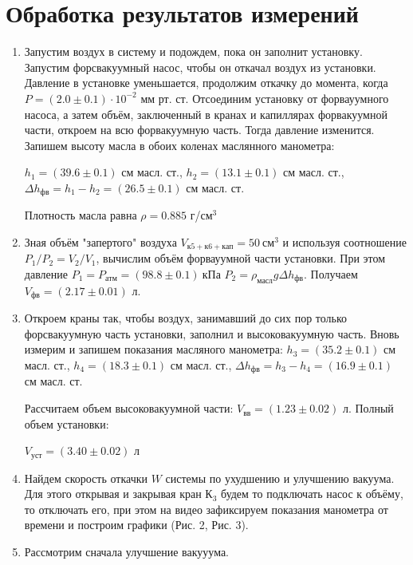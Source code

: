 \documentclass[12pt,a4paper]{article}
\begin{document}
\section{Обработка результатов измерений}
\begin{enumerate}
\item Запустим воздух в систему и подождем, пока он заполнит установку. Запустим форсвакуумный насос, чтобы он откачал воздух из установки. Давление в установке уменьшается, продолжим откачку до момента, когда $P = (2.0 \pm 0.1) \cdot 10^{-2}$ мм рт. ст. Отсоединим установку от форвауумного насоса, а затем объём, заключенный в кранах и капиллярах форвакуумной части, откроем на всю форвакуумную часть. Тогда давление изменится. Запишем высоту масла в обоих коленах маслянного манометра: 

$h_1 = (39.6 \pm 0.1)$ см масл. ст., $h_2 = (13.1 \pm 0.1)$ см масл. ст., $\Delta h_{фв} = h_1 - h_2 = (26.5 \pm 0.1)$ см масл. ст.

Плотность масла равна $\rho = 0.885$ г/см$^3$


\item Зная объём "запертого" воздуха $V_{к5+к6+кап} = 50 ~ см^3$ и используя соотношение $P_1/P_2=V_2/V_1$, вычислим объём форвауумной части установки. При этом давление $P_1 = P_{атм} = (98.8 \pm 0.1) ~ кПа$ $P_2 = \rho_{масл} g \Delta h_{фв}$. Получаем $V_{фв} = (2.17 \pm 0.01)$ л.


\item Откроем краны так, чтобы воздух, занимавший до сих пор только форсвакуумную часть установки, заполнил и высоковакуумную часть. Вновь измерим и запишем показания масляного манометра: $h_3 = (35.2 \pm 0.1)$ см масл. ст., $h_4 = (18.3 \pm 0.1)$ см масл. ст., $\Delta h_{фв} = h_3 - h_4 = (16.9 \pm 0.1)$ см масл. ст.

Рассчитаем объем высоковакуумной части: $V_{вв} = (1.23 \pm 0.02)$ л. Полный объем установки:

\begin{center}
    $V_{уст} = (3.40 \pm 0.02)$ л
\end{center}

\item Найдем скорость откачки $W$ системы по ухудшению и улучшению вакуума. Для этого открывая и закрывая кран $К_3$ будем то подключать насос к объёму, то отключать его, при этом на видео зафиксируем показания манометра от времени и построим графики (Рис. 2, Рис. 3).


\item Рассмотрим сначала улучшение вакууума.



\end{enumerate}
\end{document}
